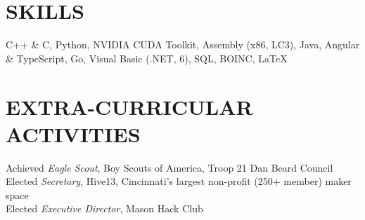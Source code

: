 \documentclass[margin]{res} %
\begin{document}
\begin{resume}
\section{SKILLS} 
 
C++ \& C, Python, NVIDIA CUDA Toolkit, Assembly (x86, LC3), Java, Angular \& TypeScript, Go, Visual Basic (.NET, 6), SQL, BOINC, LaTeX 


\section{EXTRA-CURRICULAR \\ ACTIVITIES} 

Achieved {\it Eagle Scout}, Boy Scouts of America, Troop 21 Dan Beard Council \\
Elected {\it Secretary}, Hive13, Cincinnati's largest non-profit (250+ member) maker space \\
Elected {\it Executive Director}, Mason Hack Club \\


\end{resume}
\end{document}
